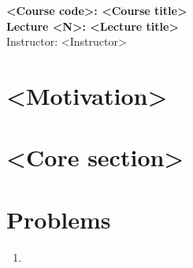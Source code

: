 \documentclass[11pt,a4paper]{article}
\theoremstyle{definition}
\theoremstyle{remark}
\begin{document}
\begin{center}
    {\LARGE \bfseries \color{primary} <Course code>: <Course title>} \\[0.5em]
    {\large \bfseries Lecture <N>: <Lecture title>} \\[0.5em]
    {\small Instructor: <Instructor>}
\end{center}

\vspace{1em}

\section{<Motivation>}

\section{<Core section>}


\section{Problems}   %
\begin{enumerate}
\item
\end{enumerate}
\end{document}
